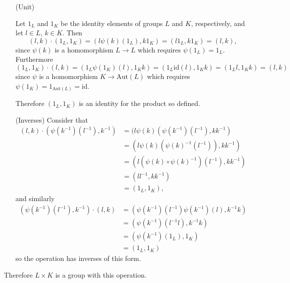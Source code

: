 \documentclass{article}
\begin{document}
\begin{Answer}
\begin{itemize}
{      $(l\psi(k)(l^\prime), k k^\prime) \in L \times K$ and thus the
      set is closed under this operation.
    }
  \item[(Unit)]
    {
      Let $1_L$ and $1_K$ be the identity elements of groups $L$ and
      $K$, respectively, and let $l \in L$, $k \in K$. Then
      $$
      (l, k) \cdot (1_L, 1_K)
    = (l \psi(k)(1_L), k 1_K)
    = (l 1_L, k 1_K)
    = (l, k),
      $$
      since $\psi(k)$ is a homomorphism $L \to L$ which requires
      $\psi(1_L) = 1_L$. Furthermore
      $$
      (1_L, 1_K) \cdot (l, k)
    = (1_L \psi(1_K)(l), 1_K k)
    = (1_L \mathrm{id}(l), 1_K k)
    = (1_L l, 1_K k)
    = (l, k)
      $$
      since $\psi$ is a homomorphism $K \to \mathrm{Aut}(L)$ which
      requires $\psi(1_K) = 1_{\mathrm{Aut}(L)} = \mathrm{id}$.

      Therefore $(1_L, 1_K)$ is an identity for the product so defined.
    }
    \item[(Inverses)]
      {Consider that
       \begin{align*}
         (l, k) \cdot (\psi(k^{-1})(l^{-1}), k^{-1})
      &= (l \psi(k)(\psi(k^{-1})(l^{-1}), k k^{-1}) \\
      &= (l \psi(k)(\psi(k)^{-1}(l^{-1})), k k^{-1}) \\
      &= (l (\psi(k) \circ \psi(k)^{-1})(l^{-1}), k k^{-1}) \\
      &= (l l^{-1}, k k^{-1}) \\
      &= (1_L, 1_K),
       \end{align*}
       and similarly
       \begin{align*}
          (\psi(k^{-1})(l^{-1}), k^{-1}) \cdot (l, k)
       &= (\psi(k^{-1})(l^{-1}) \psi(k^{-1})(l), k^{-1} k) \\
       &= (\psi(k^{-1})(l^{-1} l), k^{-1} k) \\
       &= (\psi(k^{-1})(1_L), 1_K) \\
       &= (1_L, 1_K)
       \end{align*}
       so the operation has inverses of this form.
      }
\end{itemize}
Therefore $L \times K$ is a group with this operation.
\end{Answer}

\pagebreak
\end{document}
